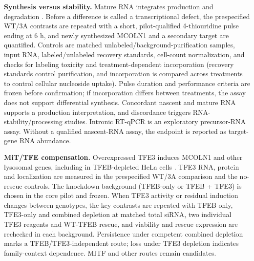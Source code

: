 \textbf{Synthesis versus stability.} Mature RNA integrates production and degradation \cite{Rabani2011}. Before a difference is called a transcriptional defect, the prespecified WT/3A contrasts are repeated with a short, pilot-qualified 4-thiouridine pulse ending at 6 h, and newly synthesized MCOLN1 and a secondary target are quantified. Controls are matched unlabeled/background-purification samples, input RNA, labeled/unlabeled recovery standards, cell-count normalization, and checks for labeling toxicity and treatment-dependent incorporation (recovery standards control purification, and incorporation is compared across treatments to control cellular nucleoside uptake). Pulse duration and performance criteria are frozen before confirmation; if incorporation differs between treatments, the assay does not support differential synthesis. Concordant nascent and mature RNA supports a production interpretation, and discordance triggers RNA-stability/processing studies. Intronic RT-qPCR is an exploratory precursor-RNA assay. Without a qualified nascent-RNA assay, the endpoint is reported as target-gene RNA abundance.

\textbf{MiT/TFE compensation.} Overexpressed TFE3 induces MCOLN1 and other lysosomal genes, including in TFEB-depleted HeLa cells \cite{Martina2014}. TFE3 RNA, protein and localization are measured in the prespecified WT/3A comparison and the no-rescue controls. The knockdown background (TFEB-only or TFEB + TFE3) is chosen in the core pilot and frozen. When TFE3 activity or residual induction changes between genotypes, the key contrasts are repeated with TFEB-only, TFE3-only and combined depletion at matched total siRNA, two individual TFE3 reagents and WT-TFEB rescue, and viability and rescue expression are rechecked in each background. Persistence under competent combined depletion marks a TFEB/TFE3-independent route; loss under TFE3 depletion indicates family-context dependence. MITF and other routes remain candidates.

